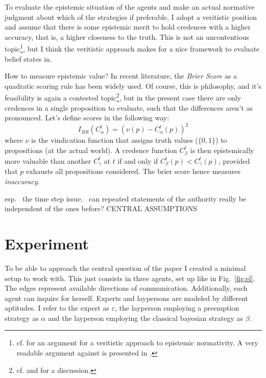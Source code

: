 \documentclass[11pt, a4paper]{article}
\renewcommand{\i}[1]{\emph{#1}}
\renewcommand{\a}{\alpha}
\begin{document}
To evaluate the epistemic situation of the agents and make an actual normative judgment about which of the strategies if preferable, I adopt a veritistic position and assume that there is some epistemic merit to hold credences with a higher accuracy, that is, a higher closeness to the truth. This is not an uncontentious topic\footnote{cf. \textcite{Goldman2001} for an argument for a veritistic approach to epistemic normativity. A very readable argument against is presented in \textcite{Berker2013}.}, but I think the veritistic approach makes for a nice framework to evaluate belief states in. 

How to measure epistemic value? In recent literature, the \i{Brier Score} as a quadratic scoring rule has been widely used. Of course, this is philosophy, and it's feasibility is again a contested topic\footnote{cf. \textcite{Joyce1998-JOYANV} and \textcite{Maher2002-MAHJAF} for a discussion.}, but in the present case there are only credences in a single proposition to evaluate, such that the differences aren't as pronounced. Let's define scores in the following way:
\begin{equation*}
    I_{BR}(C^t_\a) = {(\nu(p) - C^t_\a(p))}^2
\end{equation*}
where $\nu$ is the vindication function that assigns truth values ($\{0,1\}$) to propositions (at the actual world).
A credence function $C^t_\beta$ is then epistemically more valuable than another $C^t_\gamma$ at $t$ if and only if $C^t_\beta(p) < C^t_\gamma(p)$, provided that $p$ exhausts all propositions considered. The brier score hence measures \i{inaccuracy}.


esp. \ the time step issue. \ can repeated statements of the authority really be independent of the ones before?
CENTRAL ASSUMPTIONS

\section{Experiment}

To be able to approach the central question of the paper I created a minimal setup to work with. This just consists in three agents, set up like in Fig.~\ref{fig:el}. The edges represent available directions of communication. Additionally, each agent can inquire for herself. Experts and laypersons are modeled by different aptitudes. I refer to the expert as $\varepsilon$, the layperson employing a preemption strategy as $\a$ and the layperson employing the classical bayesian strategy as $\beta$. 
\end{document}
